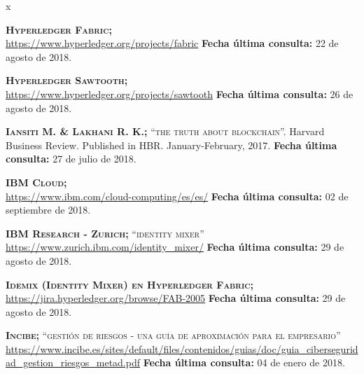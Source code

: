 \begin{thebibliography} {x}
			
	 \textsc{\textbf{Hyperledger Fabric; }} \\ 
	\url{https://www.hyperledger.org/projects/fabric} 
	\newline \textbf{Fecha última consulta:} 22 de agosto de 2018.
	
	 \textsc{\textbf{Hyperledger Sawtooth; }} \\ 
	\url{https://www.hyperledger.org/projects/sawtooth} 
	\newline \textbf{Fecha última consulta:} 26 de agosto de 2018.
				
	 \textsc{\textbf{Iansiti M. \& Lakhani R. K.; }}\textsc{“the truth about blockchain”.} Harvard Business Review. Published in HBR. January-February, 2017. 
	\newline \textbf{Fecha última consulta:} 27 de julio de 2018.
	
	 \textsc{\textbf{IBM Cloud; }} \\ 
	\url{https://www.ibm.com/cloud-computing/es/es/} 
	\newline \textbf{Fecha última consulta:} 02 de septiembre de 2018.
		
	\textsc{\textbf{IBM Research - Zurich; }} \textsc{“identity mixer”} \\
	\url{https://www.zurich.ibm.com/identity_mixer/} 
	\newline \textbf{Fecha última consulta:} 29 de agosto de 2018.
	
	 \textsc{\textbf{Idemix (Identity Mixer) en Hyperledger Fabric; }} \\ 
	\url{https://jira.hyperledger.org/browse/FAB-2005} 
	\newline \textbf{Fecha última consulta:} 29 de agosto de 2018.
		
	 \textsc{\textbf{Incibe; }}\textsc{“gestión de riesgos - una guía de aproximación para el empresario”} \\
	\url{https://www.incibe.es/sites/default/files/contenidos/guias/doc/guia_ciberseguridad_gestion_riesgos_metad.pdf}
	\newline \textbf{Fecha última consulta:} 04 de enero de 2018.
		

\end{thebibliography}
